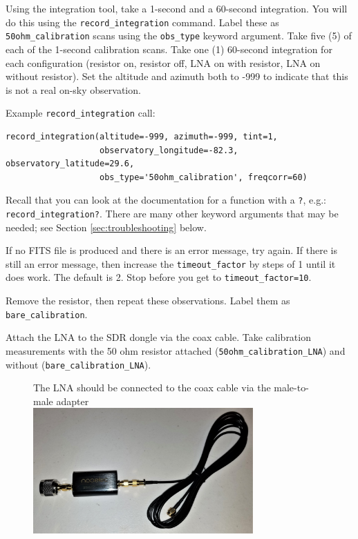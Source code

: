 \documentclass[11pt]{article}
\begin{document}
Using the integration tool, take a 1-second and a 60-second integration.
You will do this using the \verb|record_integration| command.
Label these as \verb|50ohm_calibration| scans using the \verb|obs_type| keyword argument.
Take five (5) of each of the 1-second calibration scans.  Take one (1) 60-second integration
for each configuration (resistor on, resistor off, LNA on with resistor, LNA on without resistor).
Set the altitude and azimuth both to -999 to indicate that this
is not a real on-sky observation.

Example \verb|record_integration| call:\\
\begin{verbatim}
record_integration(altitude=-999, azimuth=-999, tint=1,
                   observatory_longitude=-82.3, observatory_latitude=29.6,
                   obs_type='50ohm_calibration', freqcorr=60)
\end{verbatim}
Recall that you can look at the documentation for a function with a \verb|?|, e.g.:
\verb|record_integration?|.  There are many other keyword arguments that may be needed;
see Section \ref{sec:troubleshooting} below.



If no FITS file is produced and there is an error message, try again.
If there is still an error message, then increase the \verb|timeout_factor| by steps of 1
until it does work.  The default is 2.  Stop before you get to \verb|timeout_factor=10|.

Remove the resistor, then repeat these observations.  Label them as \verb|bare_calibration|.

Attach the LNA to the SDR dongle via the coax cable.  Take calibration
measurements with the 50 ohm resistor attached (\verb|50ohm_calibration_LNA|)
and without (\verb|bare_calibration_LNA|).


\begin{figure}[htp]
    \centering
    The LNA should be connected to the coax cable via the male-to-male adapter\\
\includegraphics[width=0.75\textwidth]{RadioLabPhotos/coaxcable_to_LNA.jpg}
\end{figure}
\end{document}
